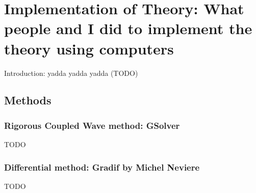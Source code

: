 \chapter{Implementation of Theory: What people and I did to implement the theory using computers}

Introduction: yadda yadda yadda (TODO)
\section{Methods}
\subsection{Rigorous Coupled Wave method: GSolver}
\label{RCW}
TODO


\subsection{Differential method: Gradif by Michel Neviere}
TODO



